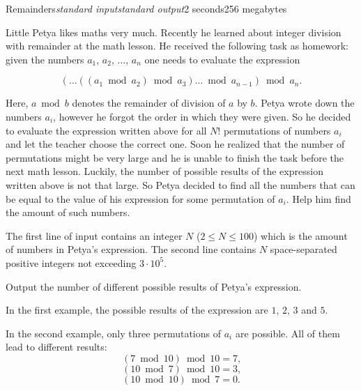 \begin{problem}{Remainders}{\textsl{standard input}}{\textsl{standard output}}{2 seconds}{256 megabytes}

Little Petya likes maths very much. Recently he learned about integer division with remainder at the math lesson. He received the following task as homework: given the numbers $a_1$, $a_2$, $\dots$, $a_n$ one needs to evaluate the expression

$$(\dots((a_{1} \bmod a_{2}) \bmod a_{3}) \dots \bmod a_{n - 1}) \bmod a_{n}\text{.}$$

Here, $a \bmod b$ denotes the remainder of division of $a$ by $b$. Petya wrote down the numbers $a_i$, however he forgot the order in which they were given. So he decided to evaluate the expression written above for all $N!$ permutations of numbers $a_i$ and let the teacher choose the correct one. Soon he realized that the number of permutations might be very large and he is unable to finish the task before the next math lesson. Luckily, the number of possible results of the expression written above is not that large. So Petya decided to find all the numbers that can be equal to the value of his expression for some permutation of $a_i$. Help him find the amount of such numbers.

\InputFile
The first line of input contains an integer $N$ ($2 \le N \le 100$) which is the amount of numbers in Petya's expression. The second line contains $N$ space-separated positive integers not exceeding $3 \cdot 10^5$.

\OutputFile
Output the number of different possible results of Petya's expression.

\Examples

\begin{example}
%
%
%
\end{example}

\Note
In the first example, the possible results of the expression are $1$, $2$, $3$ and $5$.

In the second example, only three permutations of $a_i$ are possible. All of them lead to different results:
$$(7 \bmod 10) \bmod 10 = 7\text{,}$$
$$(10 \bmod 7) \bmod 10 = 3\text{,}$$
$$(10 \bmod 10) \bmod 7 = 0\text{.}$$

\end{problem}
